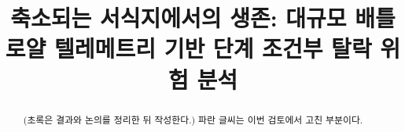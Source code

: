 \documentclass[conference]{IEEEtran}
\newcommand{\rev}[1]{{\color{revblue}#1}}
\begin{document}
\title{축소되는 서식지에서의 생존: 대규모 배틀로얄 텔레메트리 기반 단계 조건부 탈락 위험 분석}
\author{}
\maketitle

\begin{abstract}
(초록은 결과와 논의를 정리한 뒤 작성한다.) \rev{파란 글씨는 이번 검토에서 고친 부분이다.}
\end{abstract}







\end{document}

